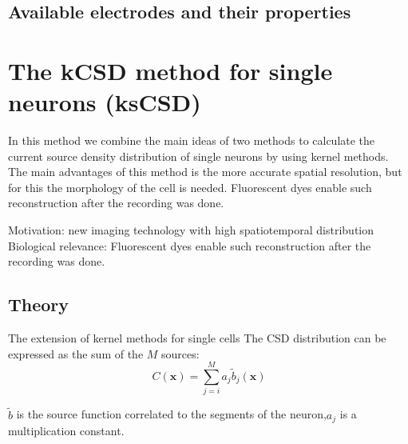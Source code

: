 \documentclass[12pt,a4paper]{article}
\begin{document}
\subsection{Available electrodes and their properties}


\section{The  kCSD method for single neurons (ksCSD)}
In this method we combine the main ideas of two methods to calculate the current source density distribution of single neurons \cite{Soma} by using kernel methods\cite{DanielW}. The main advantages of this method is the more accurate spatial resolution, but for this the morphology of the cell is needed. Fluorescent dyes enable such reconstruction after the recording was done. 


Motivation: new imaging technology with high spatiotemporal distribution
Biological relevance:   Fluorescent dyes enable such reconstruction after the recording was done.



\subsection{Theory}
The extension of kernel methods for single cells
The CSD distribution can be expressed as the sum of the $M$ sources: 
\begin{equation}
C (\textbf{x})= \sum_{j=i}^M a_j \tilde{b}_j(\textbf{x})
\end{equation}

$\tilde{b}$ is the source function correlated to the segments of the neuron,$a_j$ is a multiplication constant.




\end{document}
